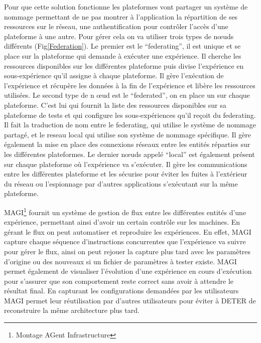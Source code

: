 Pour que cette solution fonctionne les plateformes vont partager un
système de nommage permettant de ne pas montrer à l'application la
répartition de ses ressources sur le réseau, une authentification pour
contrôler l'accès d'une plateforme à une autre. Pour gérer cela on va
utiliser trois types de n\oe uds différents (Fig\ref{Federation}). Le
premier est le ``federating'', il est unique et se place sur la
plateforme qui demande à exécuter une expérience. Il cherche les
ressources disponibles sur les différentes plateforme puis divise
l'expérience en sous-expérience qu'il assigne à chaque plateforme. Il
gère l'exécution de l'expérience et récupère les données à la fin de
l'expérience et libère les ressources utilisées. Le second type de n
\oe ud est le ``federated'', on en place un sur chaque
plateforme. C'est lui qui fournit la liste des ressources disponibles
sur sa plateforme de tests et qui configure les sous-expériences qu'il
reçoit du federating. Il fait la traduction de nom entre le
federating, qui utilise le système de nommage partagé, et le reseau
local qui utilise son système de nommage spécifique.  Il gère
également la mise en place des connexions réseaux entre les entités
réparties sur les différentes plateformes. Le dernier n\oe uds appelé
``local'' est également présent sur chaque plateforme où l'expérience
va s'exécuter. Il gère les communications entre les différentes
plateforme et les sécurise pour éviter les fuites à l'extérieur du
réseau ou l'espionnage par d'autres applications s'exécutant sur la
même plateforme.

MAGI\footnote{Montage AGent Infrastructure} fournit un système de
gestion de flux entre les différentes entités d'une expérience,
permettant ainsi d'avoir un certain contrôle sur les machines. En
gérant le flux on peut automatiser et reproduire les expériences. En
effet, MAGI capture chaque séquence d'instructions concurrentes que
l'expérience va suivre pour gérer le flux, ainsi on peut rejouer la
capture plus tard avec les paramètres d'origine ou des nouveaux si un
fichier de paramètres à tester existe. MAGI permet également de
visualiser l'évolution d'une expérience en cours d'exécution pour
s'assurer que son comportement reste correct sans avoir à attendre le
résultat final. En capturant les configurations demandées par les
utilisateurs MAGI permet leur réutilisation par d'autres utilisateurs
pour éviter à DETER de reconstruire la même architecture plus tard.

